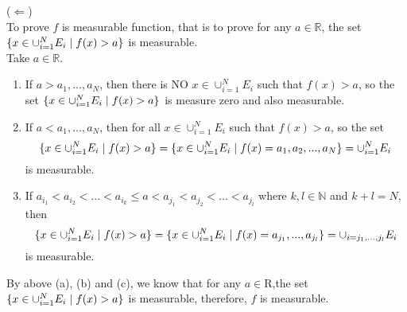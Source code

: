 \documentclass[a4paper,11pt]{article}
\begin{document}
\begin{enumerate}
($\Leftarrow$)\\
To prove $f$ is measurable function, that is to prove for any $a \in \mathbb{R}$, the set $\{ x \in \cup_{i = 1}^{N} E_i \hspace{0.1cm} | \hspace{0.1 cm} f(x) > a \}$ is measurable.\\
Take $a \in \mathbb{R}$.

\begin{enumerate}
\item If $a > a_1, ..., a_N$, then there is NO $x \in \cup_{i = 1}^{N} E_i$ such that $f(x) > a$, so the set $\{ x \in \cup_{i = 1}^{N} E_i \hspace{0.1cm} | \hspace{0.1 cm} f(x) > a \}$ is measure zero and also measurable.\\

\item If $a < a_1, ..., a_N$, then for all $x \in \cup_{i = 1}^{N} E_i$ such that $f(x) > a$, so the set
$$\{ x \in \cup_{i = 1}^{N} E_i \hspace{0.1cm} | \hspace{0.1 cm} f(x) > a \}
= \{ x \in \cup_{i = 1}^{N} E_i \hspace{0.1cm} | \hspace{0.1 cm} f(x) = a_1, a_2, ..., a_N \}
= \cup_{i = 1}^{N} E_i$$
is measurable.

\item If $a_{i_1} < a_{i_2} < ... < a_{i_k} \leq a < a_{j_1} < a_{j_2} < ... < a_{j_l}$ where $k, l \in \mathbb{N}$ and $k+l = N$, then
$$\{ x \in \cup_{i = 1}^{N} E_i \hspace{0.1cm} | \hspace{0.1 cm} f(x) > a \}
= \{ x \in \cup_{i = 1}^{N} E_i \hspace{0.1cm} | \hspace{0.1 cm} f(x) =  a_{j_1}, ..., a_{j_l} \}
= \cup_{i = j_1, ..., j_l} E_i$$
is measurable.
\end{enumerate}

By above (a), (b) and (c), we know that for any $a \in \mathrm{R}$,the set 
$\{ x \in \cup_{i = 1}^{N} E_i \hspace{0.1cm} | \hspace{0.1 cm} f(x) > a \}$ is measurable, therefore, $f$ is measurable.
\newline








\end{enumerate}
\end{document}
